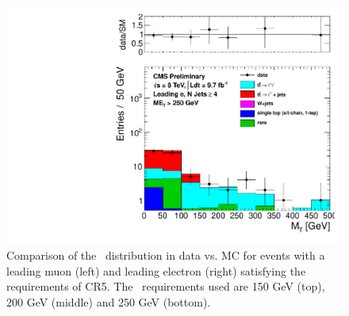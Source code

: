 \begin{figure}[hbt]
\begin{center}
        \includegraphics[width=0.5\linewidth]{plots/CR5plots/mt_met250_leadele_nj4.pdf}
    \caption{
      Comparison of the \mt\ distribution in data vs. MC for events
      with a leading muon (left) and leading electron (right)
      satisfying the requirements of CR5. The \met\ requirements used are
      150 GeV (top), 200 GeV (middle) and 250 GeV (bottom).
\label{fig:cr5mtrest} 
}  
      \end{center}
\end{figure}


\clearpage

